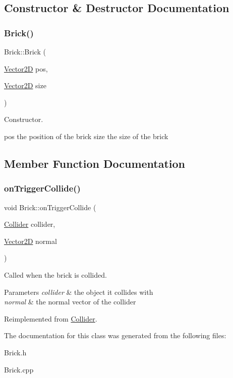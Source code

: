 \subsection{Constructor \& Destructor Documentation}
\mbox{\label{class_brick_afd403150589ffadc229a922753ff3b27}} 
\subsubsection{\texorpdfstring{Brick()}{Brick()}}
{\footnotesize\ttfamily Brick\+::\+Brick (\begin{DoxyParamCaption}\item[{\mbox{\hyperlink{struct_vector2_d}{Vector2D}}}]{pos,  }\item[{\mbox{\hyperlink{struct_vector2_d}{Vector2D}}}]{size }\end{DoxyParamCaption})}



Constructor. 

pos the position of the brick  size the size of the brick 

\subsection{Member Function Documentation}
\mbox{\label{class_brick_a37283bddbec3378192f5e8782e6f51a7}} 
\subsubsection{\texorpdfstring{on\+Trigger\+Collide()}{onTriggerCollide()}}
{\footnotesize\ttfamily void Brick\+::on\+Trigger\+Collide (\begin{DoxyParamCaption}\item[{\mbox{\hyperlink{class_collider}{Collider}}}]{collider,  }\item[{\mbox{\hyperlink{struct_vector2_d}{Vector2D}}}]{normal }\end{DoxyParamCaption})\hspace{0.3cm}{\ttfamily [virtual]}}



Called when the brick is collided. 


\begin{DoxyParams}{Parameters}
{\em collider} & the object it collides with \\
\hline
{\em normal} & the normal vector of the collider \\
\hline
\end{DoxyParams}


Reimplemented from \mbox{\hyperlink{class_collider_ae17ec8f9110acbc4df79d5addf8ac401}{Collider}}.



The documentation for this class was generated from the following files\+:\begin{DoxyCompactItemize}
\item 
Brick.\+h\item 
Brick.\+cpp\end{DoxyCompactItemize}
